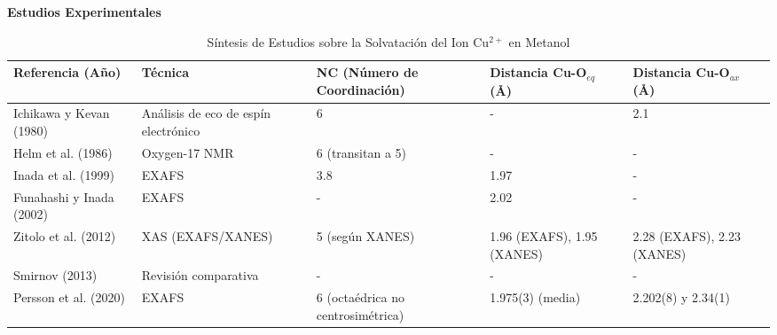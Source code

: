 \begin{sidewaystable}
    \centering
    \caption{Síntesis de Estudios sobre la Solvatación del Ion Cu$^{2+}$ en Metanol}
    \label{tab:metanol-paramteros-estructurales-experimentales-y-teoricos}
    {\scriptsize %
    
    \textbf{Estudios Experimentales}
    \vspace{2mm} %
    
    \begin{tabular}{@{}lllll@{}}
        \toprule
        \textbf{Referencia (Año)} & \textbf{Técnica} & \textbf{NC (Número de Coordinación)} & \textbf{Distancia Cu-O$_{eq}$ (\AA)} & \textbf{Distancia Cu-O$_{ax}$ (\AA)} \\
        \midrule
        Ichikawa y Kevan (1980)   & Análisis de eco de espín electrónico & 6                                         & -                                 & 2.1                                    \\
        Helm et al. (1986)        & Oxygen-17 NMR                        & 6 (transitan a 5)                         & -                                & -                                      \\
        Inada et al. (1999)       & EXAFS                                & 3.8                                      & 1.97                             & -                                     \\
        Funahashi y Inada (2002)  & EXAFS                                & -                                        & 2.02                             & -                                     \\
        Zitolo et al. (2012)      & XAS (EXAFS/XANES)                    & 5 (según XANES)                          & 1.96 (EXAFS), 1.95 (XANES)  & 2.28 (EXAFS), 2.23 (XANES)   \\
        Smirnov (2013)            & Revisión comparativa                 & -                                        & -                                & -                                     \\
        Persson et al. (2020)     & EXAFS                                & 6 (octaédrica no centrosimétrica)      & 1.975(3) (media)                 & 2.202(8) y 2.34(1)                \\
        \bottomrule
    \end{tabular}

}
\end{sidewaystable}
